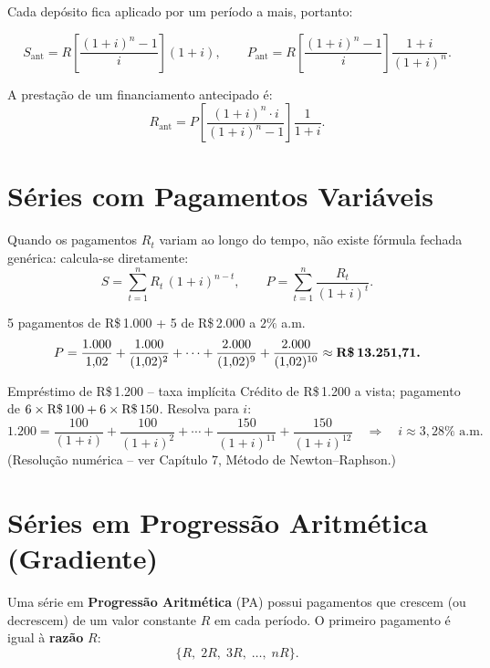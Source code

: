 Cada depósito fica aplicado por um período a mais, portanto:
\begin{resultado}
\[
  S_{\text{ant}} = R\left[\frac{(1+i)^n-1}{i}\right](1+i), \qquad
  P_{\text{ant}} = R\left[\frac{(1+i)^n-1}{i}\right]\frac{1+i}{(1+i)^n}.
\]
\end{resultado}
A prestação de um financiamento antecipado é:
\[
  R_{\text{ant}} = P\left[\frac{(1+i)^n \cdot i}{(1+i)^n - 1}\right]\frac{1}{1+i}.
\]

\section{Séries com Pagamentos Variáveis}

Quando os pagamentos $R_t$ variam ao longo do tempo, não existe fórmula fechada genérica: calcula-se diretamente:
\[
  S = \sum_{t=1}^{n} R_t\,(1+i)^{n-t},
  \qquad
  P = \sum_{t=1}^{n} \frac{R_t}{(1+i)^t}.
\]

\begin{exemplo}{5 pagamentos de R\$\,1.000 + 5 de R\$\,2.000 a $2\%$ a.m.}
\[
  P = \frac{1.000}{1{,}02} + \frac{1.000}{(1{,}02)^2} + \cdots
      + \frac{2.000}{(1{,}02)^9} + \frac{2.000}{(1{,}02)^{10}}
    \approx \textbf{R\$\,13.251{,}71.}
\]
\end{exemplo}

\begin{exemplo}{Empréstimo de R\$\,1.200 -- taxa implícita}
Crédito de R\$\,1.200 a vista; pagamento de $6 \times \text{R\$\,100} + 6 \times \text{R\$\,150}$.
Resolva para $i$:
\[
  1.200 = \frac{100}{(1+i)} + \frac{100}{(1+i)^2} + \cdots
          + \frac{150}{(1+i)^{11}} + \frac{150}{(1+i)^{12}}
  \quad\Rightarrow\quad i \approx 3{,}28\%\text{ a.m.}
\]
(Resolução numérica -- ver Capítulo 7, Método de Newton--Raphson.)
\end{exemplo}

\section{Séries em Progressão Aritmética (Gradiente)}

\begin{definicao}
Uma série em \textbf{Progressão Aritmética} (PA) possui pagamentos que crescem (ou decrescem) de um valor constante $R$ em cada período. O primeiro pagamento é igual à \textbf{razão} $R$:
\[
  \{R,\; 2R,\; 3R,\; \ldots,\; nR\}.
\]
\end{definicao}

